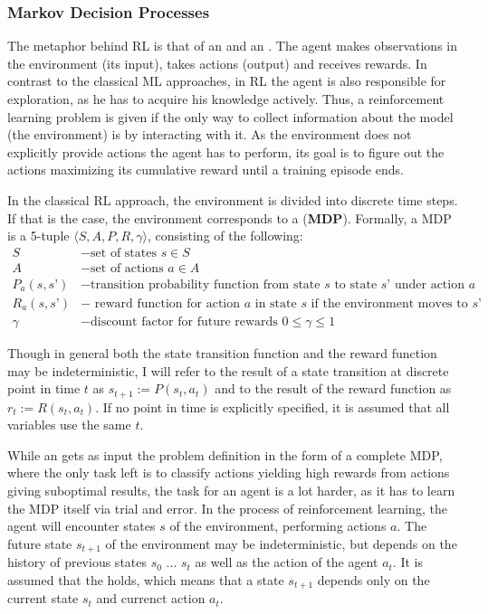 \subsubsection{Markov Decision Processes}

The metaphor behind RL is that of an  and an . The agent makes observations in the environment (its input), takes actions (output) and receives rewards. In contrast to the classical ML approaches, in RL the agent is also responsible for exploration, as he has to acquire his knowledge actively. Thus, a reinforcement learning problem is given if the only way to collect information about the model (the environment) is by interacting with it. As the environment does not explicitly provide actions the agent has to perform, its goal is to figure out the actions maximizing its cumulative reward until a training episode ends.

In the classical RL approach, the environment is divided into discrete time steps. If that is the case, the environment corresponds to a  (\textbf{MDP}). Formally, a MDP is a 5-tuple $\langle S, A, P, R, \gamma \rangle$, consisting of the following:\\
\begin{align*}
	S &- \text{set of states } s\in S\\
	A &- \text{set of actions } a \in A\\
	P_a(s, s’) &- \text{transition probability function from state } s \text{ to state } s’ \text{ under action } a\\
	R_a(s, s’) &- \text{ reward function for action } a \text{ in state } s \text{ if the environment moves to } s’\\
	\gamma &- \text{discount factor for future rewards } 0 \leq \gamma \leq 1
\end{align*}

Though in general both the state transition function and the reward function may be indeterministic, I will refer to the result of a state transition at discrete point in time $t$ as $s_{t+1} := P(s_t,a_t)$ and to the result of the reward function as $r_t := R(s_t,a_t)$. If no point in time is explicitly specified, it is assumed that all variables use the same $t$.

While an  gets as input the problem definition in the form of a complete MDP, where the only task left is to classify actions yielding high rewards from actions giving suboptimal results, the task for an  agent is a lot harder, as it has to learn the MDP itself via trial and error. In the process of reinforcement learning, the agent will encounter states $s$ of the environment, performing actions $a$. The future state $s_{t+1}$ of the environment may be indeterministic, but depends on the history of previous states $s_0$ ... $s_t$ as well as the action of the agent $a_t$. It is assumed that the  holds, which means that a state  $s_{t+1}$ depends only on the current state $s_t$ and currenct action $a_t$.

